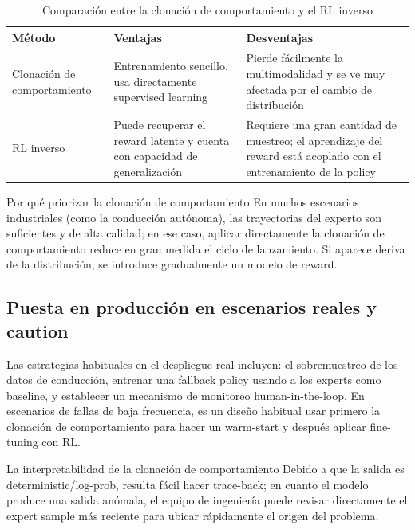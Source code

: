\begin{table}[H]
\centering
\begin{tabular}{p{} p{} p{}}
\toprule
Método & Ventajas & Desventajas \\
\midrule
Clonación de comportamiento & Entrenamiento sencillo, usa directamente supervised learning & Pierde fácilmente la multimodalidad y se ve muy afectada por el cambio de distribución \\
RL inverso & Puede recuperar el reward latente y cuenta con capacidad de generalización & Requiere una gran cantidad de muestreo; el aprendizaje del reward está acoplado con el entrenamiento de la policy \\
\bottomrule
\end{tabular}
\caption{Comparación entre la clonación de comportamiento y el RL inverso}
\end{table}

\begin{knowledgebox}{Por qué priorizar la clonación de comportamiento}
En muchos escenarios industriales (como la conducción autónoma), las trayectorias del experto son suficientes y de alta calidad; en ese caso, aplicar directamente la clonación de comportamiento reduce en gran medida el ciclo de lanzamiento. Si aparece deriva de la distribución, se introduce gradualmente un modelo de reward.
\end{knowledgebox}

\subsection{Puesta en producción en escenarios reales y caution}

Las estrategias habituales en el despliegue real incluyen: el sobremuestreo de los datos de conducción, entrenar una fallback policy usando a los experts como baseline, y establecer un mecanismo de monitoreo human-in-the-loop. En escenarios de fallas de baja frecuencia, es un diseño habitual usar primero la clonación de comportamiento para hacer un warm-start y después aplicar fine-tuning con RL.

\begin{importantbox}{La interpretabilidad de la clonación de comportamiento}
Debido a que la salida es deterministic/log-prob, resulta fácil hacer trace-back; en cuanto el modelo produce una salida anómala, el equipo de ingeniería puede revisar directamente el expert sample más reciente para ubicar rápidamente el origen del problema.
\end{importantbox}

